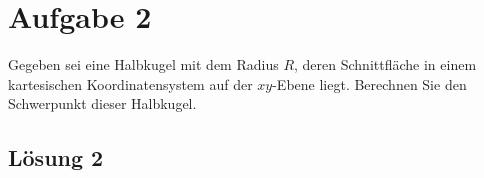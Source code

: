 \documentclass[main.tex]{subfiles}
\begin{document}
\section{Aufgabe 2}
Gegeben sei eine Halbkugel mit dem Radius $R$, deren Schnittfläche in einem kartesischen Koordinatensystem auf der $xy$-Ebene liegt. Berechnen Sie den Schwerpunkt dieser Halbkugel. 

\subsection{Lösung 2}
\end{document}
